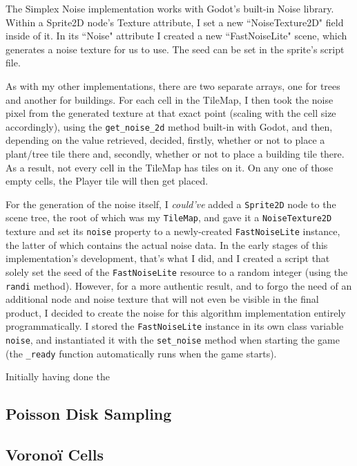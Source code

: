 The Simplex Noise implementation works with Godot's built-in Noise library. Within a Sprite2D node's Texture attribute, I set a new ``NoiseTexture2D" field inside of it. In its ``Noise" attribute I created a new ``FastNoiseLite" scene, which generates a noise texture for us to use. The seed can be set in the sprite's script file.

As with my other implementations, there are two separate arrays, one for trees and another for buildings. For each cell in the TileMap, I then took the noise pixel from the generated texture at that exact point (scaling with the cell size accordingly), using the \verb|get_noise_2d| method built-in with Godot, and then, depending on the value retrieved, decided, firstly, whether or not to place a plant/tree tile there and, secondly, whether or not to place a building tile there. As a result, not every cell in the TileMap has tiles on it. On any one of those empty cells, the Player tile will then get placed.

For the generation of the noise itself, I \textit{could've} added a \verb|Sprite2D| node to the scene tree, the root of which was my \verb|TileMap|, and gave it a \verb|NoiseTexture2D| texture and set its \verb|noise| property to a newly-created \verb|FastNoiseLite| instance, the latter of which contains the actual noise data. In the early stages of this implementation's development, that's what I did, and I created a script that solely set the seed of the \verb|FastNoiseLite| resource to a random integer (using the \verb|randi| method). However, for a more authentic result, and to forgo the need of an additional node and noise texture that will not even be visible in the final product, I decided to create the noise for this algorithm implementation entirely programmatically. I stored the \verb|FastNoiseLite| instance in its own class variable \verb|noise|, and instantiated it with the \verb|set_noise| method when starting the game (the \verb|_ready| function automatically runs when the game starts).

Initially having done the 

\subsection{Poisson Disk Sampling}

\subsection{Voronoï Cells}